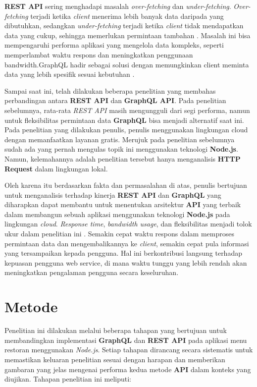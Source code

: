 \documentclass[
 manuscript=article,  %
  layout=publish, 
  year=2024, 
  month= Februari, %
  volume=8,
  number=1 
]{JIKO}
\begin{document}
\textbf{REST API} sering menghadapi masalah \textit{over-fetching} dan \textit{under-fetching}. \textit{Over-fetching} terjadi ketika \textit{client} menerima lebih banyak data daripada yang dibutuhkan, sedangkan \textit{under-fetching} terjadi ketika \textit{client} tidak mendapatkan data yang cukup, sehingga memerlukan permintaan tambahan \cite{[3]}. Masalah ini bisa mempengaruhi performa aplikasi yang mengelola data kompleks, seperti memperlambat waktu respons dan meningkatkan penggunaan bandwidth.GraphQL hadir sebagai solusi dengan memungkinkan client meminta data yang lebih spesifik sesuai kebutuhan \cite{[4]}.

Sampai saat ini, telah dilakukan beberapa penelitian yang membahas perbandingan antara \textbf{REST API} dan \textbf{GraphQL API}. Pada penelitian sebelumnya, rata-rata \textit{REST API} masih mengungguli dari segi performa, namun untuk fleksibilitas permintaan data \textbf{GraphQL} bisa menjadi alternatif saat ini. Pada penelitian yang dilakukan penulis, penulis menggunakan lingkungan cloud dengan memanfaatkan layanan gratis. Merujuk pada penelitian sebelumnya sudah ada yang pernah mengulas topik ini menggunakan teknologi \textbf{Node.js}. Namun, kelemahannya adalah penelitian tersebut hanya menganalisis \textbf{HTTP Request} dalam lingkungan lokal.

Oleh karena itu berdasarkan fakta dan permasalahan di atas, penulis bertujuan untuk menganalisis terhadap kinerja \textbf{REST API} dan \textbf{GraphQL} yang diharapkan dapat membantu untuk menentukan arsitektur \textbf{API} yang terbaik dalam membangun sebuah aplikasi menggunakan teknologi \textbf{Node.js} pada lingkungan \textit{cloud}. \textit{Response time}, \textit{bandwidth usage}, dan fleksibilitas menjadi tolok ukur dalam penelitian ini \cite{[5]}. Semakin cepat waktu respons dalam memproses permintaan data dan mengembalikannya ke \textit{client}, semakin cepat pula informasi yang tersampaikan kepada pengguna. Hal ini berkontribusi langsung terhadap kepuasan pengguna web service, di mana waktu tunggu yang lebih rendah akan meningkatkan pengalaman pengguna secara keseluruhan.

\section{Metode}

Penelitian ini dilakukan melalui beberapa tahapan yang bertujuan untuk membandingkan implementasi \textbf{GraphQL} dan \textbf{REST API} pada aplikasi menu restoran menggunakan \textit{Node.js}. Setiap tahapan dirancang secara sistematis untuk memastikan keluaran penelitian sesuai dengan harapan dan memberikan gambaran yang jelas mengenai performa kedua metode \textbf{API} dalam konteks yang diujikan. Tahapan penelitian ini meliputi:
\end{document}
